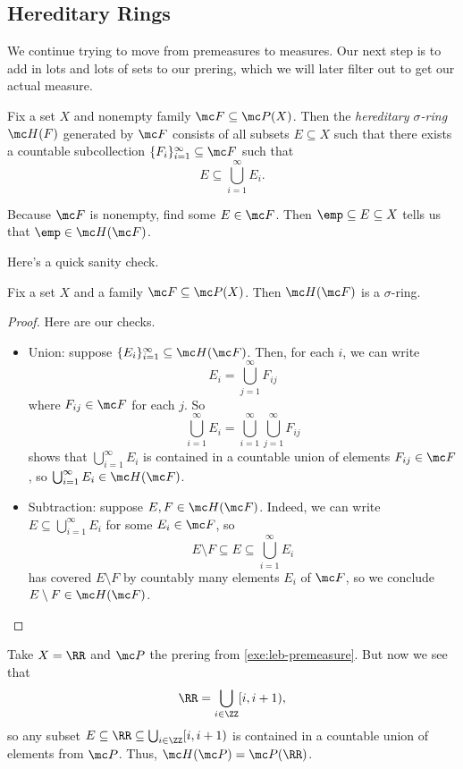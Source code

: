 \documentclass[../notes.tex]{subfiles}
\begin{document}
\subsection{Hereditary Rings}
We continue trying to move from premeasures to measures. Our next step is to add in lots and lots of sets to our prering, which we will later filter out to get our actual measure.
\begin{definition}
	Fix a set $X$ and nonempty family $\mc F\subseteq\mc P(X)$. Then the \textit{hereditary $\sigma$-ring} $\mc H(F)$ generated by $\mc F$ consists of all subsets $E\subseteq X$ such that there exists a countable subcollection $\{F_i\}_{i=1}^\infty\subseteq\mc F$ such that
	\[E\subseteq\bigcup_{i=1}^\infty E_i.\]
\end{definition}
\begin{remark}
	Because $\mc F$ is nonempty, find some $E\in\mc F$. Then $\emp\subseteq E\subseteq X$ tells us that $\emp\in\mc H(\mc F)$.
\end{remark}
Here's a quick sanity check.
\begin{lemma} \label{lem:hf-is-sigma-ring}
	Fix a set $X$ and a family $\mc F\subseteq\mc P(X)$. Then $\mc H(\mc F)$ is a $\sigma$-ring.
\end{lemma}
\begin{proof}
	Here are our checks.
	\begin{itemize}
		\item Union: suppose $\{E_i\}_{i=1}^\infty\subseteq\mc H(\mc F)$. Then, for each $i$, we can write
		\[E_i=\bigcup_{j=1}^\infty F_{ij}\]
		where $F_{ij}\in\mc F$ for each $j$. So
		\[\bigcup_{i=1}^\infty E_i=\bigcup_{i=1}^\infty\bigcup_{j=1}^\infty F_{ij}\]
		shows that $\bigcup_{i=1}^\infty E_i$ is contained in a countable union of elements $F_{ij}\in\mc F$, so $\bigcup_{i=1}^\infty E_i\in\mc H(\mc F)$.
		\item Subtraction: suppose $E,F\in\mc H(\mc F)$. Indeed, we can write $E\subseteq\bigcup_{i=1}^\infty E_i$ for some $E_i\in\mc F$, so
		\[E\setminus F\subseteq E\subseteq\bigcup_{i=1}^\infty E_i\]
		has covered $E\setminus F$ by countably many elements $E_i$ of $\mc F$, so we conclude $E\setminus F\in\mc H(\mc F)$.
		\qedhere
	\end{itemize}
\end{proof}
\begin{example}
	Take $X=\RR$ and $\mc P$ the prering from \autoref{exe:leb-premeasure}. But now we see that
	\[\RR=\bigcup_{i\in\ZZ}[i,i+1),\]
	so any subset $E\subseteq\RR\subseteq\bigcup_{i\in\ZZ}[i,i+1)$ is contained in a countable union of elements from $\mc P$. Thus, $\mc H(\mc P)=\mc P(\RR)$.
\end{example}
\end{document}

